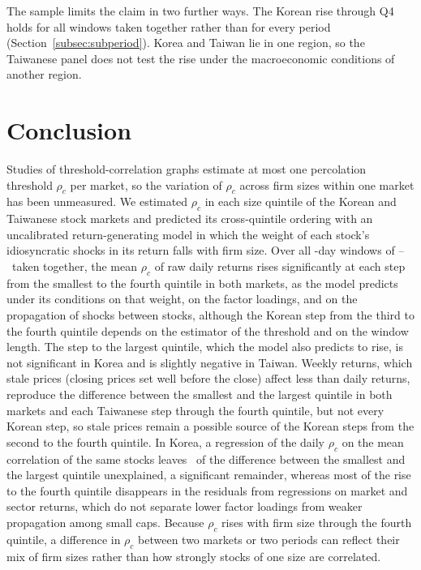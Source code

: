 \documentclass[a4paper,fleqn]{cas-sc}
\begin{document}
The sample limits the claim in two further ways. The Korean rise through Q4 holds for all windows taken together rather than for every period (Section~\ref{subsec:subperiod}). Korea and Taiwan lie in one region, so the Taiwanese panel does not test the rise under the macroeconomic conditions of another region.

\section{Conclusion}\label{sec:conclusion}

Studies of threshold-correlation graphs estimate at most one percolation threshold $\rho_c$ per market, so the variation of $\rho_c$ across firm sizes within one market has been unmeasured. We estimated $\rho_c$ in each size quintile of the Korean and Taiwanese stock markets and predicted its cross-quintile ordering with an uncalibrated return-generating model in which the weight of each stock's idiosyncratic shocks in its return falls with firm size. Over all \paperWindowDays-day windows of \paperSampleStart--\paperSampleEnd\ taken together, the mean $\rho_c$ of raw daily returns rises significantly at each step from the smallest to the fourth quintile in both markets, as the model predicts under its conditions on that weight, on the factor loadings, and on the propagation of shocks between stocks, although the Korean step from the third to the fourth quintile depends on the estimator of the threshold and on the window length. The step to the largest quintile, which the model also predicts to rise, is not significant in Korea and is slightly negative in Taiwan. Weekly returns, which stale prices (closing prices set well before the close) affect less than daily returns, reproduce the difference between the smallest and the largest quintile in both markets and each Taiwanese step through the fourth quintile, but not every Korean step, so stale prices remain a possible source of the Korean steps from the second to the fourth quintile. In Korea, a regression of the daily $\rho_c$ on the mean correlation of the same stocks leaves \rhoCResidGapPctOfRaw\ of the difference between the smallest and the largest quintile unexplained, a significant remainder, whereas most of the rise to the fourth quintile disappears in the residuals from regressions on market and sector returns, which do not separate lower factor loadings from weaker propagation among small caps. Because $\rho_c$ rises with firm size through the fourth quintile, a difference in $\rho_c$ between two markets or two periods can reflect their mix of firm sizes rather than how strongly stocks of one size are correlated.
\end{document}
